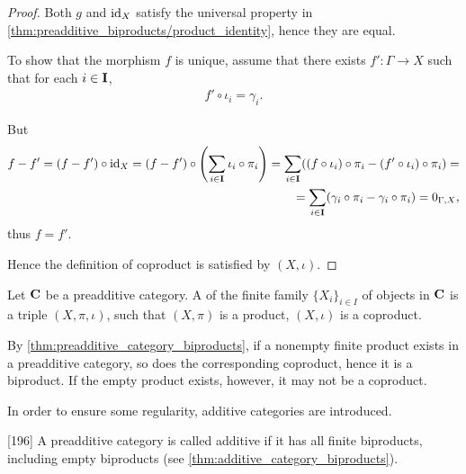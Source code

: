 \begin{proof}
  Both \( g \) and \( \operatorname{id}_X \) satisfy the universal property in \cref{thm:preadditive_biproducts/product_identity}, hence they are equal.

  To show that the morphism \( f \) is unique, assume that there exists \( f': \Gamma \to X \) such that for each \( i \in \operatorname{\mathbf{I}} \),
  \begin{align*}
    f' \circ \iota_i = \gamma_i.
  \end{align*}

  But
  \begin{align*}
    f - f'
    =
    (f - f') \circ \operatorname{id}_X
    =
    (f - f') \circ \left( \sum_{i \in \operatorname{\mathbf{I}}} \iota_i \circ \pi_i \right)
    =
    \sum_{i \in \operatorname{\mathbf{I}}} ((f \circ \iota_i) \circ \pi_i - (f' \circ \iota_i) \circ \pi_i)
    = \\ =
    \sum_{i \in \operatorname{\mathbf{I}}} (\gamma_i \circ \pi_i - \gamma_i \circ \pi_i)
    =
    0_{\Gamma,X},
  \end{align*}
  thus \( f = f' \).

  Hence the definition of coproduct is satisfied by \( (X, \iota) \).
\end{proof}

\begin{definition}\label{def:categorical_biproduct}
  Let \( \operatorname{\mathbf{C}} \) be a preadditive category. A  of the finite family \( \{ X_i \}_{i \in I} \) of objects in \( \operatorname{\mathbf{C}} \) is a triple \( (X, \pi, \iota) \), such that \( (X, \pi) \) is a product, \( (X, \iota) \) is a coproduct.
\end{definition}

\begin{note}\label{note:preadditive_category_biproducts}
  By \cref{thm:preadditive_category_biproducts}, if a nonempty finite product exists in a preadditive category, so does the corresponding coproduct, hence it is a biproduct. If the empty product exists, however, it may not be a coproduct.

  In order to ensure some regularity, additive categories are introduced.
\end{note}

\begin{definition}\label{def:additive_category}\cite{MacLane1994}[196]
  A preadditive category is called additive if it has all finite biproducts, including empty biproducts (see \cref{thm:additive_category_biproducts}).
\end{definition}

